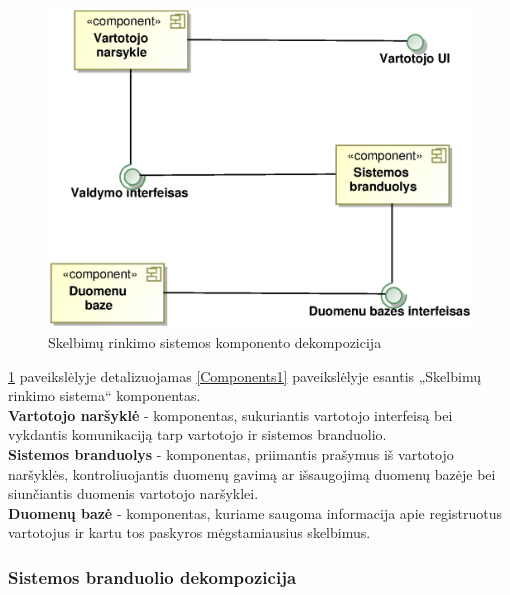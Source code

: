 \documentclass[12pt]{article}
\begin{document}
	\begin{figure}[h]
		\begin{center}
			\includegraphics[width=\textwidth]{Komponentai2.eps}
			\caption{Skelbimų rinkimo sistemos komponento dekompozicija\label{Components2}}
		\end{center}
	\end{figure}
	
	\ref{Components2} paveikslėlyje detalizuojamas \ref{Components1} paveikslėlyje esantis „Skelbimų rinkimo sistema“ komponentas.\\

	\textbf{Vartotojo naršyklė} - komponentas, sukuriantis vartotojo interfeisą bei vykdantis komunikaciją tarp vartotojo ir sistemos branduolio.\\

	
	\textbf{Sistemos branduolys} - komponentas, priimantis prašymus iš vartotojo naršyklės, kontroliuojantis duomenų gavimą ar išsaugojimą duomenų bazėje bei siunčiantis duomenis vartotojo naršyklei.\\

	
	\textbf{Duomenų bazė} - komponentas, kuriame saugoma informacija apie registruotus vartotojus ir kartu tos paskyros mėgstamiausius skelbimus.\\
	\pagebreak

	\subsubsection{Sistemos branduolio dekompozicija}
	
\end{document}
